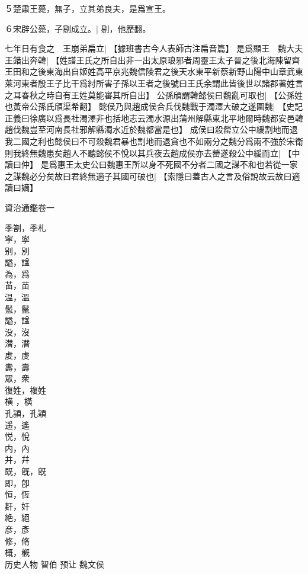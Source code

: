 ５楚肅王薨，無子，立其弟良夫，是爲宣王。

６宋辟公薨，子剔成立。|{
	剔，他歷翻。
	}


七年日有食之　王崩弟扁立|{
	【據班書古今人表師古注扁音篇】}
是爲顯王　魏大夫王錯出奔韓|{
	【姓譜王氏之所自出非一出太原琅邪者周靈王太子晉之後北海陳留齊王田和之後東海出自姬姓高平京兆魏信陵君之後天水東平新蔡新野山陽中山章武東萊河東者殷王子比干爲紂所害子孫以王者之後號曰王氏余謂此皆後世以諸郡著姓言之耳春秋之時自有王姓莫能審其所自出】}
公孫頎謂韓懿侯曰魏亂可取也|{
	【公孫姓也黃帝公孫氏頎渠希翻】}
懿侯乃與趙成侯合兵伐魏戰于濁澤大破之遂圍魏|{
	【史記正義曰徐廣以爲長社濁澤非也括地志云濁水源出蒲州解縣東北平地爾時魏都安邑韓趙伐魏豈至河南長社邪解縣濁水近於魏都當是也】}
成侯曰殺罃立公中緩割地而退我二國之利也懿侯曰不可殺魏君暴也割地而退貪也不如兩分之魏分爲兩不強於宋衛則我終無魏患矣趙人不聽懿侯不悅以其兵夜去趙成侯亦去罃遂殺公中緩而立|{
	【中讀曰仲】}
是爲惠王太史公曰魏惠王所以身不死國不分者二國之謀不和也若從一家之謀魏必分矣故曰君終無適子其國可破也|{
	【索隱曰蓋古人之言及俗說故云故曰適讀曰嫡】}
\par
資治通鑑卷一

季劄，季札\\
寜，寧\\
别，別\\
謚，諡\\
為，爲\\
苖，苗\\
温，溫\\
鬛，鬣\\
謚，諡\\
没，沒\\
潜，潛\\
䖍，虔\\
夀，壽\\
眾，衆\\
復姓，複姓\\
横                                                                                                                                                            ，橫\\
孔頴，孔穎\\
遥，遙\\
悦，悅\\
内，內\\
并，幷\\
既，旣，旣\\
即，卽\\
恒，恆\\
姧，奸\\
絶，絕\\
彦，彥\\
修，脩\\
概，槪\\

历史人物
智伯
预让
魏文侯
